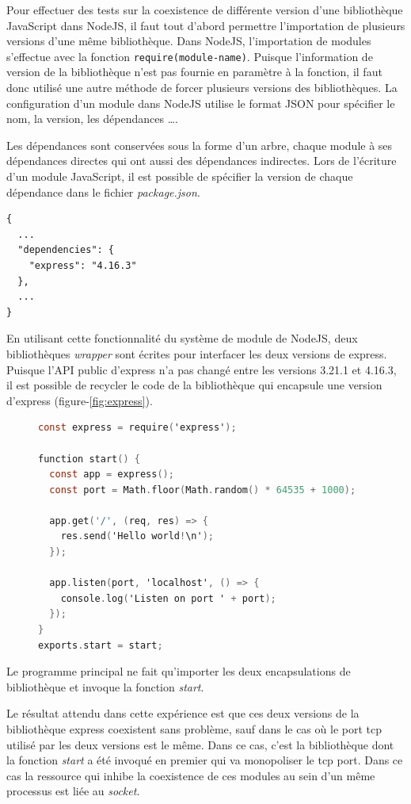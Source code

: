 Pour effectuer des tests sur la coexistence de différente version d'une bibliothèque
JavaScript dans NodeJS, il faut tout d'abord permettre l'importation de plusieurs
versions d'une même bibliothèque. Dans NodeJS, l'importation de modules s'effectue
avec la fonction \verb|require(module-name)|. Puisque l'information de version
de la bibliothèque n'est pas fournie en paramètre à la fonction, il faut donc
utilisé une autre méthode de forcer plusieurs versions des bibliothèques.
La configuration d'un module dans NodeJS utilise le format JSON pour spécifier
le nom, la version, les dépendances \dots.

Les dépendances sont conservées sous la forme d'un arbre, chaque module à ses dépendances directes
qui ont aussi des dépendances indirectes.  Lors de l'écriture d'un module JavaScript, il est possible
de spécifier la version de chaque dépendance dans le fichier \textit{package.json}.
\begin{verbatim}
{
  ...
  "dependencies": {
    "express": "4.16.3"
  },
  ...
}
\end{verbatim}
En utilisant cette fonctionnalité du système de module de NodeJS, deux bibliothèques \textit{wrapper}
sont écrites pour interfacer les deux versions de express. Puisque l'API public d'express n'a pas changé entre
les versions 3.21.1 et 4.16.3, il est possible de recycler le code de la bibliothèque qui encapsule une
version d'express (figure-\ref{fig:express}).
\begin{center}
\begin{figure}[ht]
    \begin{lstlisting}[language=C,frame=single]
const express = require('express');

function start() {
  const app = express();
  const port = Math.floor(Math.random() * 64535 + 1000);

  app.get('/', (req, res) => {
    res.send('Hello world!\n');
  });

  app.listen(port, 'localhost', () => {
    console.log('Listen on port ' + port);
  });
}
exports.start = start;
\end{lstlisting}
\end{figure}
\label{fig:express}
\end{center}
Le programme principal ne fait qu'importer les deux encapsulations de bibliothèque
et invoque la fonction \textit{start}.

Le résultat attendu dans cette expérience est que ces deux versions de la bibliothèque
express coexistent sans problème, sauf dans le cas où le port tcp utilisé par les deux
versions est le même. Dans ce cas, c'est la bibliothèque dont la fonction
\textit{start} a été invoqué en premier qui va monopoliser le tcp port. Dans ce cas
la ressource qui inhibe la coexistence de ces modules au sein d'un même processus
est liée au \textit{socket}.

